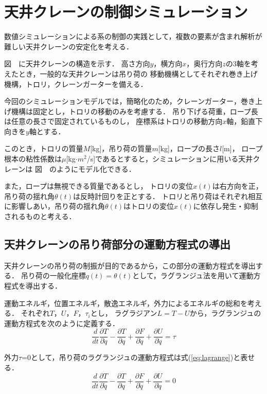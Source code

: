 \documentclass[dvipdfmx,titlepage,a4j]{jsarticle}  %
\begin{document}
\section{天井クレーンの制御シミュレーション}
数値シミュレーションによる系の制御の実践として，複数の要素が含まれ解析が難しい天井クレーンの安定化を考える．

図　に天井クレーンの構造を示す．
高さ方向$y$，横方向$x$，奥行方向$z$の3軸を考えたとき，一般的な天井クレーンは吊り荷の
移動機構としてそれぞれ巻き上げ機構，トロリ，クレーンガーターを備える．

今回のシミュレーションモデルでは，簡略化のため，クレーンガーター，巻き上げ機構は固定とし，トロリの移動のみを考慮する．
吊り下げる荷重，ロープ長は任意の長さで固定されているものし，
座標系はトロリの移動方向$x$軸，鉛直下向きを$y$軸とする．

このとき，トロリの質量$M$[kg]，吊り荷の質量$m$[kg]，ロープの長さ$l$[m]，
ロープ根本の粘性係数は$\mu$[kg$\cdot m^2$/s]であるとすると，シミュレーションに用いる天井クレーンは
図　のようにモデル化できる．

また，ロープは無視できる質量であるとし，
トロリの変位$x(t)$は右方向を正，吊り荷の揺れ角$\theta(t)$は反時計回りを正とする．
トロリと吊り荷はそれぞれ相互に影響しあい，吊り荷の揺れ角$\theta(t)$はトロリの変位$x(t)$に依存し発生・抑制されるものと考える．

\subsection{天井クレーンの吊り荷部分の運動方程式の導出}
天井クレーンの吊り荷の制振が目的であるから，この部分の運動方程式を導出する．
吊り荷の一般化座標$q(t) = \theta(t)$として，ラグランジュ法を用いて運動方程式を導出する．

運動エネルギ，位置エネルギ，散逸エネルギ，外力によるエネルギの総和を考える．
それぞれ$T$，$U$，$F$，$\tau_i$とし，
ラグラジアン$L = T - U$から，ラグランジュの運動方程式を次のように定義する．
\begin{equation}
  \frac{d}{dt} \frac{\partial T}{\partial \dot{q}} - \frac{\partial T}{\partial q} + \frac{\partial F}{\partial \dot q} + \frac{\partial U}{\partial \dot q} = \tau \nonumber
\end{equation}

外力$\tau$=0として，吊り荷のラグランジュの運動方程式は式(\ref{eq:lagrange})と表せる．
\begin{equation}
  \frac{d}{dt} \frac{\partial T}{\partial \dot{q}} - \frac{\partial T}{\partial q} + \frac{\partial F}{\partial \dot q} + \frac{\partial U}{\partial \dot q} = 0 \label{eq:lagrange}
\end{equation}
\end{document}
